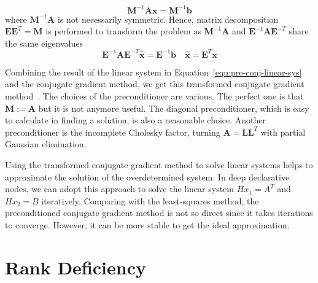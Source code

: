 \begin{equation}
    \mathbf{M}^{-1} \mathbf{A} \mathbf{x}=\mathbf{M}^{-1} \mathbf{b}
\end{equation}
where $\mathbf{M}^{-1} \mathbf{A}$ is not necessarily symmetric. Hence, matrix decomposition $\mathbf{E} \mathbf{E}^{T}=\mathbf{M}$ is performed to transform the problem as $\mathbf{M}^{-1} \mathbf{A}$ and $\mathbf{E}^{-1} \mathbf{A} \mathbf{E}^{-T}$ share the same eigenvalues
\begin{equation}
    \label{equ:pre-conj-linear-sys}
    \mathbf{E}^{-1} \mathbf{A} \mathbf{E}^{-T} \hat{\mathbf{x}}=\mathbf{E}^{-1} \mathbf{b} \quad \hat{\mathbf{x}}=\mathbf{E}^{T} \mathbf{x}
\end{equation}
\par Combining the result of the linear system in Equation~\ref{equ:pre-conj-linear-sys} and the conjugate gradient method, we get this transformed conjugate gradient method~\citep{SJ:94}. The choices of the preconditioner are various. The perfect one is that $\mathbf{M} := \mathbf{A}$ but it is not anymore useful. The diagonal preconditioner, which is easy to calculate in finding a solution, is also a reasonable choice. Another preconditioner is the incomplete Cholesky factor, turning $\mathbf{A} = \mathbf{L}\mathbf{L}^T$ with partial Gaussian elimination. 
\par Using the transformed conjugate gradient method to solve linear systems helps to approximate the solution of the overdetermined system. In deep declarative nodes, we can adopt this approach to solve the linear system $Hx_1 = A^T$ and $Hx_2 = B$ iteratively. Comparing with the least-squares method, the preconditioned conjugate gradient method is not so direct since it takes iterations to converge. However, it can be more stable to get the ideal approximation. 


\section{Rank Deficiency}
\label{sec:rankdf-sol}
